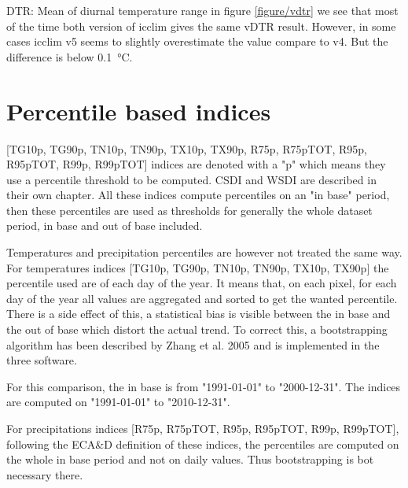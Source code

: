 \documentclass[a4paper,11pt]{article}
\begin{document}
    DTR: Mean of diurnal temperature range
    in figure \ref{figure/vdtr} we see that most of the time both version of icclim gives the same vDTR result.
    However, in some cases icclim v5 seems to slightly overestimate the value compare to v4. But the difference is below 0.1 °C.

\section{Percentile based indices}
    [TG10p, TG90p, TN10p, TN90p, TX10p, TX90p, R75p, R75pTOT, R95p, R95pTOT, R99p, R99pTOT] indices are denoted with a "p" which means they use a percentile threshold to be computed. CSDI and WSDI are described in their own chapter.
    All these indices compute percentiles on an "in base" period, then these percentiles are used as thresholds for generally the whole dataset period, in base and out of base included.

    Temperatures and precipitation percentiles are however not treated the same way. 
    For temperatures indices [TG10p, TG90p, TN10p, TN90p, TX10p, TX90p] the percentile used are of each day of the year. It means that, on each pixel, for each day of the year all values are aggregated and sorted to get the wanted percentile. 
    There is a side effect of this, a statistical bias is visible between the in base and the out of base which distort the actual trend.
    To correct this, a bootstrapping algorithm has been described by Zhang et al. 2005 \cite{quote/zhang_et_al} and is implemented in the three software.

    For this comparison, the in base is from "1991-01-01" to "2000-12-31".
    The indices are computed on "1991-01-01" to "2010-12-31".

    For precipitations indices [R75p, R75pTOT, R95p, R95pTOT, R99p, R99pTOT], following the ECA\&D definition of these indices, the percentiles are computed on the whole in base period and not on daily values. Thus bootstrapping is bot necessary there.
\end{document}
